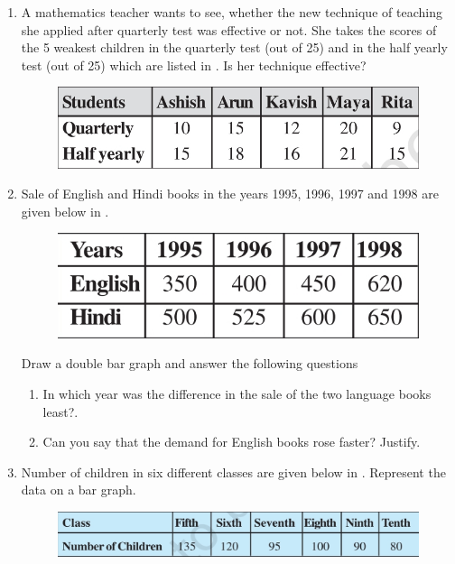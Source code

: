 \begin{enumerate}[label=\thesection.\arabic*, ref=\thesection.\theenumi,resume*]
\begin{figure}[H]
  \caption{}
  \label{fig:bar2}
\end{figure}
\item A mathematics teacher wants to see, whether the new technique of teaching she applied after quarterly test was effective or not. She takes the scores of the 5 weakest children in the quarterly test (out of 25) and in the half yearly test (out of 25) which are listed in 
.  Is her technique effective?
	\begin{figure}[H]
  \centering
  \includegraphics[width=\columnwidth]{figs/bar3.jpg}
  \caption{}
  \label{fig:bar3}
\end{figure}
\item	Sale of English and Hindi books in the years 1995, 1996, 1997 and 1998 are given below in
.
	\begin{figure}[H]
  \centering
  \includegraphics[width=\columnwidth]{figs/bar4.jpg}
  \caption{}
  \label{fig:bar4}
\end{figure}
Draw a double bar graph and answer the following questions
\begin{enumerate}
\item In which year was the difference in the sale of the two language books least?.
\item  Can you say that the demand for English books rose faster? Justify.
\end{enumerate}
\item 
	Number of children in six different classes are given below
  in .
 Represent the data on a bar graph.
	\begin{figure}[H]
  \centering
  \includegraphics[width=\columnwidth]{figs/bar5.jpg}

\end{figure}
\end{enumerate}
